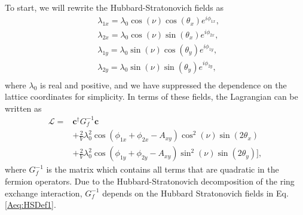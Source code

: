 \documentclass[prb,aps,twocolumn,groupaddress,floatfix]{revtex4-1}
\begin{document}
To start, we will rewrite the Hubbard-Stratonovich fields as
\begin{equation}
\begin{split}
&\lambda_{1x} = \lambda_0 \cos(\nu)\cos(\theta_x)e^{i\phi_{1x}},\\
&\lambda_{2x} = \lambda_0 \cos(\nu)\sin(\theta_x)e^{i\phi_{2x}},\\
&\lambda_{1y} = \lambda_0 \sin(\nu)\cos(\theta_y)e^{i\phi_{1y}},\\
&\lambda_{2y} = \lambda_0 \sin(\nu)\sin(\theta_y)e^{i\phi_{2y}},\\
\end{split}\label{Aeq:HSDef1}
\end{equation}
where $\lambda_0$ is real and positive, and we have suppressed the dependence on the lattice coordinates for simplicity. In terms of these fields, the Lagrangian can be written as
\begin{equation}
\begin{split}
\mathcal{L} = &\bm{c}^\dagger G_f^{-1} \bm{c} \\ & + \frac{2}{V} \lambda^2_0 \cos(\phi_{1x} + \phi_{2x}- A_{xy})\cos^2(\nu)\sin(2\theta_x)\\&  + \frac{2}{V} \lambda^2_0\cos(\phi_{1y} + \phi_{2y}- A_{xy})\sin^2(\nu)\sin(2\theta_y)],
\end{split}
\end{equation}
where $G_f^{-1} $ is the matrix which contains all terms that are quadratic in the fermion operators. Due to the Hubbard-Stratonovich decomposition of the ring exchange interaction, $G_f^{-1} $ depends on the Hubbard Stratonovich fields in Eq. \ref{Aeq:HSDef1}. 
\end{document}
